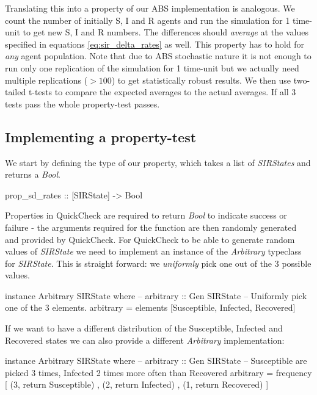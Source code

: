 Translating this into a property of our ABS implementation is analogous. We count the number of initially S, I and R agents and run the simulation for 1 time-unit to get new S, I and R numbers. The differences should \textit{average} at the values specified in equations \ref{eq:sir_delta_rates} as well. This property has to hold for \textit{any} agent population. Note that due to ABS stochastic nature it is not enough to run only one replication of the simulation for 1 time-unit but we actually need multiple replications ($> 100$) to get statistically robust results. We then use two-tailed t-tests to compare the expected averages to the actual averages. If all 3 tests pass the whole property-test passes.

\subsection{Implementing a property-test}
We start by defining the type of our property, which takes a list of \textit{SIRStates} and returns a \textit{Bool}.

\begin{HaskellCode}
prop_sd_rates :: [SIRState] -> Bool
\end{HaskellCode}

Properties in QuickCheck are required to return \textit{Bool} to indicate success or failure - the arguments required for the function are then randomly generated and provided by QuickCheck. For QuickCheck to be able to generate random values of \textit{SIRState} we need to implement an instance of the \textit{Arbitrary} typeclass for \textit{SIRState}. This is straight forward: we \textit{uniformly} pick one out of the 3 possible values.

\begin{HaskellCode}
instance Arbitrary SIRState where
  -- arbitrary :: Gen SIRState
  -- Uniformly pick one of the 3 elements.
  arbitrary = elements [Susceptible, Infected, Recovered]
\end{HaskellCode}

If we want to have a different distribution of the Susceptible, Infected and Recovered states we can also provide a different \textit{Arbitrary} implementation:

\begin{HaskellCode}
instance Arbitrary SIRState where
  -- arbitrary :: Gen SIRState
  -- Susceptible are picked 3 times, Infected 2 times more often than Recovered
  arbitrary = frequency [ (3, return Susceptible)
                        , (2, return Infected)
                        , (1, return Recovered) ]
\end{HaskellCode}

